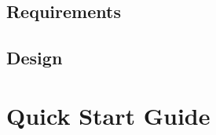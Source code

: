 \documentclass[11pt]{article}
\begin{document}
\subsection{Requirements}

\subsection{Design}

\setcounter{section}{4}

\section{Quick Start Guide}

\begin{thebibliography}{99}

\end{thebibliography}
\end{document}
